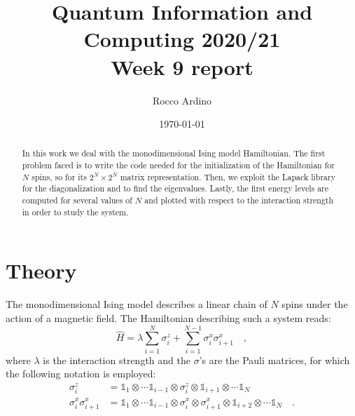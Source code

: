 \documentclass[pra, onecolumn, notitlepage, floats, 11pt]{revtex4-1}
\begin{document}
\title{Quantum Information and Computing 2020/21\\Week 9 report}

\author{Rocco Ardino}

\date{\today}





\begin{abstract}
    In this work we deal with the monodimensional Ising model Hamiltonian. The first problem faced is to write the code needed for the initialization of the Hamiltonian for \( N \) spins, so for its \( 2^{N} \times 2^{N} \) matrix representation. Then, we exploit the Lapack library for the diagonalization and to find the eigenvalues. Lastly, the first energy levels are computed for several values of \( N \) and plotted with respect to the interaction strength in order to study the system.
\end{abstract}

\maketitle





\section{Theory}
The monodimensional Ising model describes a linear chain of \( N \) spins under the action of a magnetic field. The Hamiltonian describing such a system reads:
\begin{equation}
    \hat{H}
    =
    \lambda \sum_{i=1}^{N} \sigma_{i}^{z} + \sum_{i=1}^{N-1} \sigma_{i}^{x} \sigma_{i+1}^{x}
    \quad ,
    \label{eq:09_T_1}
\end{equation}
where \( \lambda \) is the interaction strength and the \( \sigma \)'s are the Pauli matrices, for which the following notation is employed:
\begin{align}
    \sigma_{i}^{z}
    &=
        \mathbb{1}_{1} \otimes \cdots \mathbb{1}_{i-1} \otimes \sigma_{i}^{z} \otimes \mathbb{1}_{i+1} \otimes \cdots \mathbb{1}_{N}    \\
    \sigma_{i}^{x} \sigma_{i+1}^{x}
    &=
        \mathbb{1}_{1} \otimes \cdots \mathbb{1}_{i-1} \otimes \sigma_{i}^{x} \otimes \sigma_{i+1}^{x} \otimes \mathbb{1}_{i+2} \otimes \cdots \mathbb{1}_{N}
        \quad .
\end{align}
\end{document}
